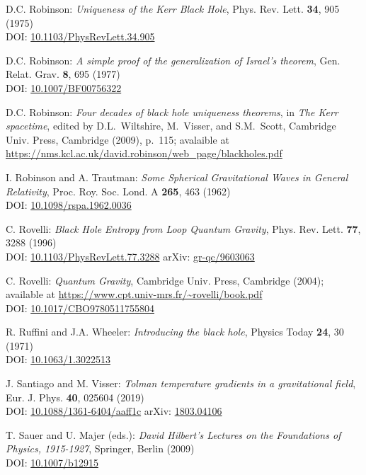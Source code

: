 \begin{thebibliography}{123}
D.C. Robinson:
{\em Uniqueness of the Kerr Black Hole},
Phys. Rev. Lett. {\bf 34}, 905 (1975)\\
DOI: \href{https://doi.org/10.1103/PhysRevLett.34.905}{10.1103/PhysRevLett.34.905}

D.C. Robinson:
{\em A simple proof of the generalization of Israel's theorem},
Gen. Relat. Grav. {\bf 8}, 695 (1977)\\
DOI: \href{https://doi.org/10.1007/BF00756322}{10.1007/BF00756322}

D.C. Robinson:
{\em Four decades of black hole uniqueness theorems},
in {\em The Kerr spacetime}, edited by D.L.~Wiltshire, M.~Visser, and S.M.~Scott,
Cambridge Univ. Press, Cambridge (2009), p.~115; avalaible at\\
\url{https://nms.kcl.ac.uk/david.robinson/web_page/blackholes.pdf}

I. Robinson and A. Trautman:
{\em Some Spherical Gravitational Waves in General Relativity},
Proc. Roy. Soc. Lond. A {\bf 265}, 463 (1962)\\
DOI: \href{https://doi.org/10.1098/rspa.1962.0036}{10.1098/rspa.1962.0036}

C. Rovelli:
{\em Black Hole Entropy from Loop Quantum Gravity},
Phys. Rev. Lett. {\bf 77}, 3288 (1996)\\
DOI: \href{https://doi.org/10.1103/PhysRevLett.77.3288}{10.1103/PhysRevLett.77.3288}\hfill
arXiv: \href{https://arxiv.org/abs/gr-qc/9603063}{gr-qc/9603063}

C. Rovelli:
{\em Quantum Gravity},
Cambridge Univ. Press, Cambridge (2004); available at
\url{https://www.cpt.univ-mrs.fr/~rovelli/book.pdf}\\
DOI: \href{https://doi.org/10.1017/CBO9780511755804}{10.1017/CBO9780511755804}

R. Ruffini and J.A. Wheeler:
{\em Introducing the black hole},
Physics Today {\bf 24}, 30 (1971)\\
DOI: \href{https://doi.org/10.1063/1.3022513}{10.1063/1.3022513}

J. Santiago and M. Visser:
{\em Tolman temperature gradients in a gravitational field},
Eur. J. Phys. {\bf 40}, 025604 (2019)\\
DOI: \href{https://doi.org/10.1088/1361-6404/aaff1c}{10.1088/1361-6404/aaff1c}\hfill
arXiv: \href{https://arxiv.org/abs/1803.04106}{1803.04106}

T. Sauer and U. Majer (eds.):
{\em David Hilbert’s Lectures on the Foundations of Physics, 1915-1927},
Springer, Berlin (2009)\\
DOI: \href{https://doi.org/10.1007/b12915}{10.1007/b12915}


\end{thebibliography}
